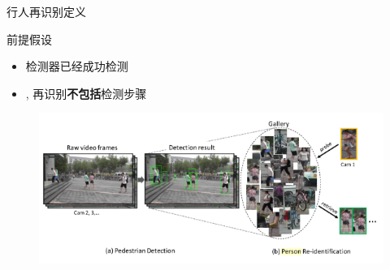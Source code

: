 \documentclass[notes]{beamer}
\begin{document}
\begin{frame}
	{行人再识别定义}
	\begin{block}{前提假设}
		\begin{itemize}
			\item 检测器已经成功检测
			\item \ie, 再识别{\bf 不包括}检测步骤
		\end{itemize}
	\end{block}
	\begin{figure}
		\includegraphics[width=1\linewidth]{2018-03-07-19-55-19.png}
	\end{figure}
\end{frame}
		
\end{document}
